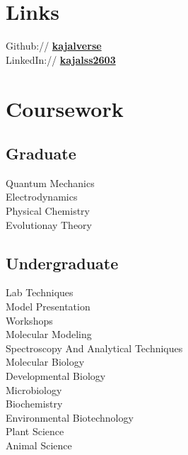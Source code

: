 \documentclass[]{kajalverse-resume}
\begin{document}
\begin{minipage}[t]{0.33\textwidth}

\section{Links} 
Github:// \href{https://github.com/kajalverse}{\bf kajalverse} \\
LinkedIn:// \href{https://www.linkedin.com/in/kajalss2603}{\bf kajalss2603} \\
\sectionsep


\section{Coursework}

\subsection{Graduate}
Quantum Mechanics \\
Electrodynamics\\
Physical Chemistry  \\
Evolutionay Theory \\
\subsection{}
\subsection{Undergraduate} 
Lab Techniques \\
Model Presentation \\
Workshops \\
Molecular Modeling\\
Spectroscopy And Analytical Techniques \\
Molecular Biology \\
Developmental Biology \\
Microbiology \\
Biochemistry \\
Environmental Biotechnology \\
Plant Science \\
Animal Science \\


\sectionsep

%
%

\end{minipage}
\end{document}
